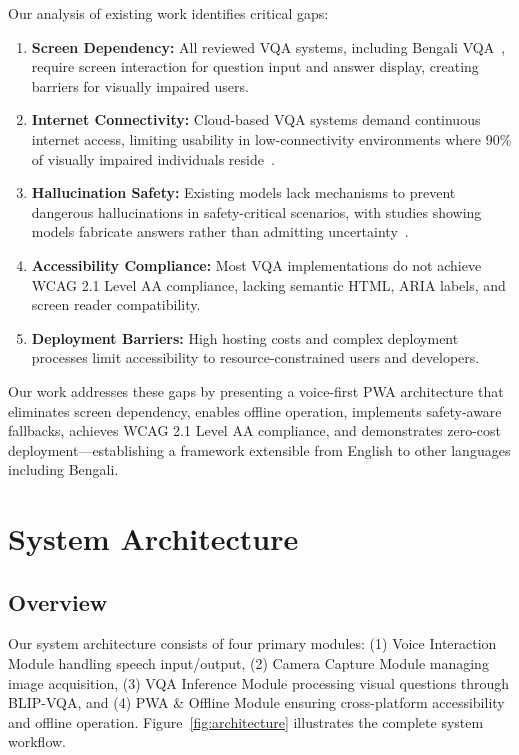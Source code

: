 \documentclass[conference]{IEEEtran}
\begin{document}
Our analysis of existing work identifies critical gaps:

\begin{enumerate}
    \item \textbf{Screen Dependency:} All reviewed VQA systems, including Bengali VQA~\cite{bengali_vqa_2024}, require screen interaction for question input and answer display, creating barriers for visually impaired users.
    
    \item \textbf{Internet Connectivity:} Cloud-based VQA systems demand continuous internet access, limiting usability in low-connectivity environments where 90\% of visually impaired individuals reside~\cite{who_2023}.
    
    \item \textbf{Hallucination Safety:} Existing models lack mechanisms to prevent dangerous hallucinations in safety-critical scenarios, with studies showing models fabricate answers rather than admitting uncertainty~\cite{vizwiz_lf_2024}.
    
    \item \textbf{Accessibility Compliance:} Most VQA implementations do not achieve WCAG 2.1 Level AA compliance, lacking semantic HTML, ARIA labels, and screen reader compatibility.
    
    \item \textbf{Deployment Barriers:} High hosting costs and complex deployment processes limit accessibility to resource-constrained users and developers.
\end{enumerate}

Our work addresses these gaps by presenting a voice-first PWA architecture that eliminates screen dependency, enables offline operation, implements safety-aware fallbacks, achieves WCAG 2.1 Level AA compliance, and demonstrates zero-cost deployment—establishing a framework extensible from English to other languages including Bengali.

\section{System Architecture}

\subsection{Overview}

Our system architecture consists of four primary modules: (1) Voice Interaction Module handling speech input/output, (2) Camera Capture Module managing image acquisition, (3) VQA Inference Module processing visual questions through BLIP-VQA, and (4) PWA \& Offline Module ensuring cross-platform accessibility and offline operation. Figure~\ref{fig:architecture} illustrates the complete system workflow.
\end{document}
